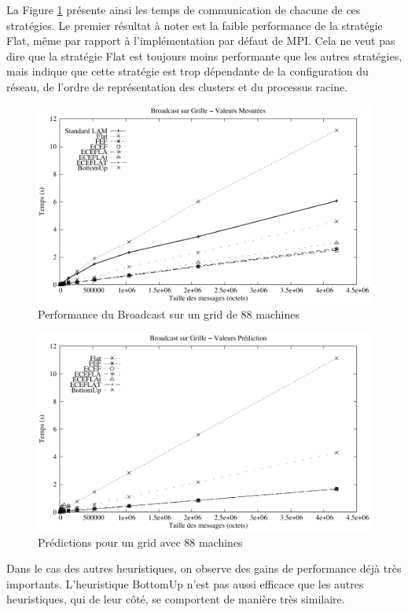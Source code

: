 La Figure \ref{Figure: Bcast - Case1 - Mesure} présente ainsi les temps de communication de chacune de ces stratégies. Le premier résultat à noter est la faible performance de la stratégie
Flat, même par rapport à l'implémentation par défaut de MPI. Cela
ne veut pas dire que la stratégie Flat est toujours moins performante
que les autres stratégies, mais indique que cette stratégie est trop
dépendante de la configuration du réseau, de l'ordre de représentation
des clusters et du processus racine.
%
\begin{figure}[h]
	\centering
		\includegraphics[width=0.7\linewidth]{images/Grid/Bcast/case1/comp}
	\caption{\label{Figure: Bcast - Case1 - Mesure}Performance du Broadcast sur
		un grid de 88 machines }	
\end{figure}

\begin{figure}[h]
	\centering
		\includegraphics[width=0.7\linewidth]{images/Grid/Bcast/case1/simul}	
	\caption{\label{Figure: Bcastcase1predictions}Prédictions pour un grid
		avec 88 machines}
	
\end{figure}

Dans le cas des autres heuristiques, on observe des gains de performance
déjà très importants. L'heuristique BottomUp %
n'est pas aussi efficace que les autres heuristiques,
qui de leur côté, se comportent de manière très similaire.

